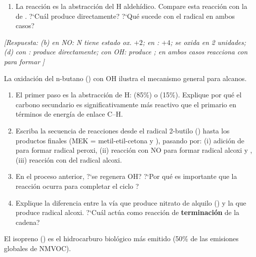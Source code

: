 \begin{bloque_ejercicios}
\begin{ejercicios}
\begin{enumerate}[label=\alph*)]
    \item La reacci\'on 
          es la abstracci\'on del H aldeh\'idico. Compare esta
          reacci\'on con la de . ?`Cu\'al
          produce  directamente? ?`Qu\'e sucede
          con el radical  en ambos casos?
\end{enumerate}

\textit{[Respuesta:
(b) en NO: N tiene estado ox. $+2$; en : $+4$;
    se oxida en 2 unidades;
(d) con : produce  directamente;
    con OH: produce ; en ambos casos 
    reacciona con  para formar ]}

\item La oxidaci\'on del n-butano () con OH ilustra
el mecanismo general para alcanos.

\begin{enumerate}[label=\alph*)]
    \item El primer paso es la abstracci\'on de H:
           (85\%) o
           (15\%).
          Explique por qu\'e el carbono secundario es
          significativamente m\'as reactivo que el primario
          en t\'erminos de energ\'ia de enlace C--H.

    \item Escriba la secuencia de reacciones desde el radical
          2-butilo () hasta los productos
          finales (MEK = metil-etil-cetona y ),
          pasando por:
          (i) adici\'on de  para formar radical peroxi,
          (ii) reacci\'on con NO para formar radical alcoxi y ,
          (iii) reacci\'on con  del radical alcoxi.

    \item En el proceso anterior, ?`se regenera OH? ?`Por qu\'e
          es importante que la reacci\'on 
          ocurra para completar el ciclo ?

    \item Explique la diferencia entre la v\'ia que produce
          nitrato de alquilo () y
          la que produce radical alcoxi. ?`Cu\'al act\'ua
          como reacci\'on de \textbf{terminaci\'on} de la cadena?
\end{enumerate}

\item El isopreno () es el hidrocarburo
biol\'ogico m\'as emitido (50\% de las emisiones globales de NMVOC).


\end{ejercicios}
\end{bloque_ejercicios}
